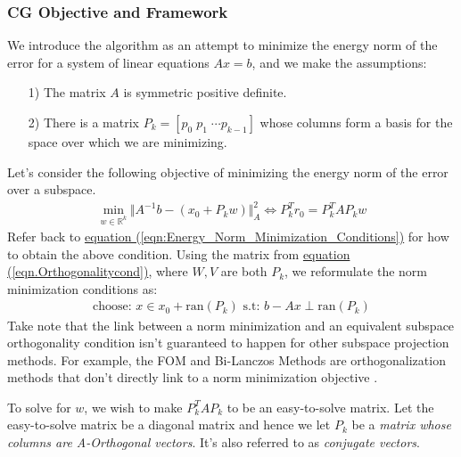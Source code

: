 \documentclass[]{article}
\theoremstyle{definition}
\begin{document}
        \subsubsection{CG Objective and Framework}
            We introduce the algorithm as an attempt to minimize the energy norm of the error for a system of linear equations $Ax = b$, and we make the assumptions: 
            \begin{itemize}
                \item [1)] The matrix $A$ is symmetric positive definite.  
                \item [2)] There is a matrix $P_k = [p_0 \;p_1\;\cdots p_{k-1}]$ whose columns form a basis for the space over which we are minimizing.
            \end{itemize}
            Let's consider the following objective of minimizing the energy norm of the error over a subspace. 
            \begin{align}
                \min_{w \in \mathbb{R}^k}\Vert 
                    A^{-1}b - (x_0 + P_kw)
                \Vert_A^2 \iff P^T_kr_0 = P_k^TAP_kw
            \end{align}
            Refer back to \hyperref[eqn:Energy_Norm_Minimization_Conditions]{equation (\ref*{eqn:Energy_Norm_Minimization_Conditions})} for how to obtain the above condition. Using the matrix
            from \hyperref[eqn.Orthogonalitycond]{equation (\ref*{eqn.Orthogonalitycond})},
            where $W, V$ are both $P_k$, we reformulate the norm minimization conditions as: 
            \begin{align}
                \text{choose: }x \in x_0 + \text{ran}(P_k) \text{ s.t: } b - Ax \perp \text{ran}(P_k)    
            \end{align}
            Take note that the link between a norm minimization and an equivalent subspace orthogonality condition isn't guaranteed to happen for other subspace projection methods. For example, the FOM and Bi-Lanczos Methods are orthogonalization methods that don't directly link to a norm minimization objective \cite{paper:FOM}. 
            \par
            To solve for $w$, we wish to make $P_k^TAP_k$ to be an easy-to-solve matrix. Let the easy-to-solve matrix be a diagonal matrix and hence we let $P_k$ be a \textit{matrix whose columns are A-Orthogonal vectors}. It's also referred to as \textit{conjugate vectors}. 
\end{document}
